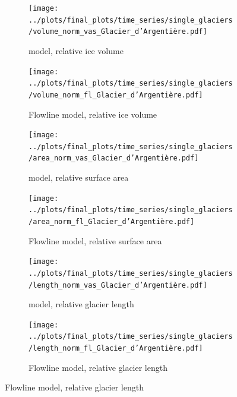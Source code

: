 \begin{figure}[p]
  \centering

  \begin{subfigure}[b]{0.476\textwidth}
    \caption{\Vas{} model, relative ice volume}
    \label{fig:Glacier_d_Argentiere:volume_vas}
    \centering
    \texttt{[image: ../plots/final\_plots/time\_series/single\_glaciers/volume\_norm\_vas\_Glacier\_d'Argentière.pdf]}
  \end{subfigure}
  \hfill
  \begin{subfigure}[b]{0.476\textwidth}
    \caption{Flowline model, relative ice volume}
    \label{fig:Glacier_d_Argentiere:volume_fl}
    \centering
    \texttt{[image: ../plots/final\_plots/time\_series/single\_glaciers/volume\_norm\_fl\_Glacier\_d'Argentière.pdf]}
  \end{subfigure}

  \begin{subfigure}[b]{0.476\textwidth}
    \caption{\Vas{} model, relative surface area}
    \label{fig:Glacier_d_Argentiere:area_vas}
    \centering
    \texttt{[image: ../plots/final\_plots/time\_series/single\_glaciers/area\_norm\_vas\_Glacier\_d'Argentière.pdf]}
  \end{subfigure}
  \hfill
  \begin{subfigure}[b]{0.476\textwidth}
    \caption{Flowline model, relative surface area}
    \label{fig:Glacier_d_Argentiere:area_fl}
    \centering
    \texttt{[image: ../plots/final\_plots/time\_series/single\_glaciers/area\_norm\_fl\_Glacier\_d'Argentière.pdf]}
  \end{subfigure}

  \begin{subfigure}[b]{0.476\textwidth}
    \caption{\Vas{} model, relative glacier length}
    \label{fig:Glacier_d_Argentiere:length_vas}
    \centering
    \texttt{[image: ../plots/final\_plots/time\_series/single\_glaciers/length\_norm\_vas\_Glacier\_d'Argentière.pdf]}
  \end{subfigure}
  \hfill
  \begin{subfigure}[b]{0.476\textwidth}
    \caption{Flowline model, relative glacier length}
    \label{fig:Glacier_d_Argentiere:length_fl}
    \centering
    \texttt{[image: ../plots/final\_plots/time\_series/single\_glaciers/length\_norm\_fl\_Glacier\_d'Argentière.pdf]}
  \end{subfigure}
  

\end{figure}
